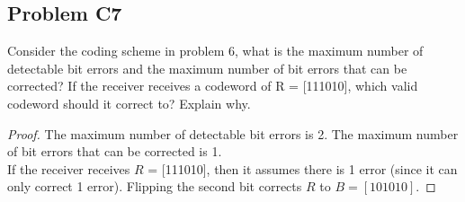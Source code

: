 \documentclass[../../../main.tex]{subfiles}
\begin{document}
\subsection{Problem C7}
\begin{wts}
    Consider the coding scheme in problem 6, what is the maximum number of detectable bit errors and the maximum number of bit errors that can be corrected? If the receiver receives a codeword of R = [111010], which valid codeword should it correct to? Explain why.
\end{wts}
\begin{proof}
The maximum number of detectable bit errors is 2. The maximum number of bit errors that can be corrected is 1.\\

If the receiver receives $R$ = [111010], then it assumes there is 1 error (since it can only correct 1 error). Flipping the second bit corrects $R$ to $B=[101010]$.
\end{proof}
\end{document}
